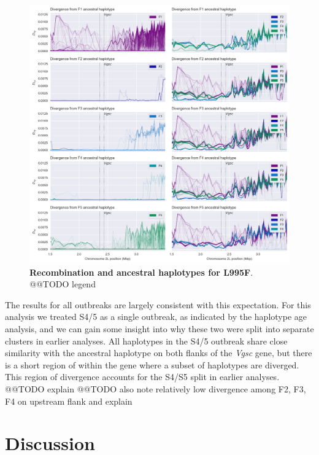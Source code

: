 \documentclass[a4paper,11pt,abstracton]{scrartcl}
\begin{document}
%
\begin{figure}[!b]
  \includegraphics[width=1.1\linewidth,center]{artwork/fig_recom.png}
  \caption{\textbf{Recombination and ancestral haplotypes for L995F}. @@TODO legend}
  \label{fig:recom_f}
\end{figure}


%
The results for all outbreaks are largely consistent with this expectation.
%
For this analysis we treated S4/5 as a single outbreak, as indicated by the haplotype age analysis, and we can gain some insight into why these two were split into separate clusters in earlier analyses.
%
All haplotypes in the S4/5 outbreak share close similarity with the ancestral haplotype on both flanks of the \textit{Vgsc} gene, but there is a short region of within the gene where a subset of haplotypes are diverged.
%
This region of divergence accounts for the S4/S5 split in earlier analyses.
%
@@TODO explain
%
@@TODO also note relatively low divergence among F2, F3, F4 on upstream flank and explain


\section*{Discussion}
\end{document}
